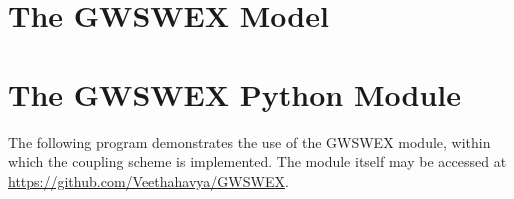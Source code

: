 

\chapter{The GWSWEX Model}
\label{GWSWEX_program}



\chapter{The GWSWEX Python Module}
\label{GWSWEX_module}
The following program demonstrates the use of the GWSWEX module, within which the coupling scheme is implemented. The module itself may be accessed at \url{https://github.com/Veethahavya/GWSWEX}.




\endinput